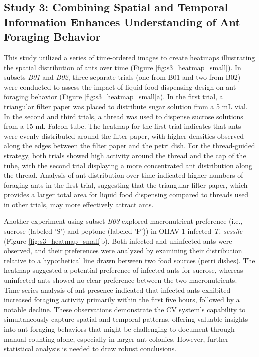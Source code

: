 \subsection{Study 3: Combining Spatial and Temporal Information Enhances Understanding of Ant Foraging Behavior}

This study utilized a series of time-ordered images to create heatmaps illustrating the spatial distribution of ants over time (Figure \ref{fig:s3_heatmap_small}). In subsets \textit{B01} and \textit{B02}, three separate trials (one from B01 and two from B02) were conducted to assess the impact of liquid food dispensing design on ant foraging behavior (Figure \ref{fig:s3_heatmap_small}a). In the first trial, a triangular filter paper was placed to distribute sugar solution from a 5 mL vial. In the second and third trials, a thread was used to dispense sucrose solutions from a 15 mL Falcon tube. The heatmap for the first trial indicates that ants were evenly distributed around the filter paper, with higher densities observed along the edges between the filter paper and the petri dish. For the thread-guided strategy, both trials showed high activity around the thread and the cap of the tube, with the second trial displaying a more concentrated ant distribution along the thread. Analysis of ant distribution over time indicated higher numbers of foraging ants in the first trial, suggesting that the triangular filter paper, which provides a larger total area for liquid food dispensing compared to threads used in other trials, may more effectively attract ants.

Another experiment using subset \textit{B03} explored macronutrient preference (i.e., sucrose (labeled 'S') and peptone (labeled 'P')) in OHAV-1 infected \emph{T. sessile} (Figure \ref{fig:s3_heatmap_small}b). Both infected and uninfected ants were observed, and their preferences were analyzed by examining their distribution relative to a hypothetical line drawn between two food sources (petri dishes). The heatmap suggested a potential preference of infected ants for sucrose, whereas uninfected ants showed no clear preference between the two macronutrients. Time-series analysis of ant presence indicated that infected ants exhibited increased foraging activity primarily within the first five hours, followed by a notable decline. These observations demonstrate the CV system's capability to simultaneously capture spatial and temporal patterns, offering valuable insights into ant foraging behaviors that might be challenging to document through manual counting alone, especially in larger ant colonies. However, further statistical analysis is needed to draw robust conclusions.

